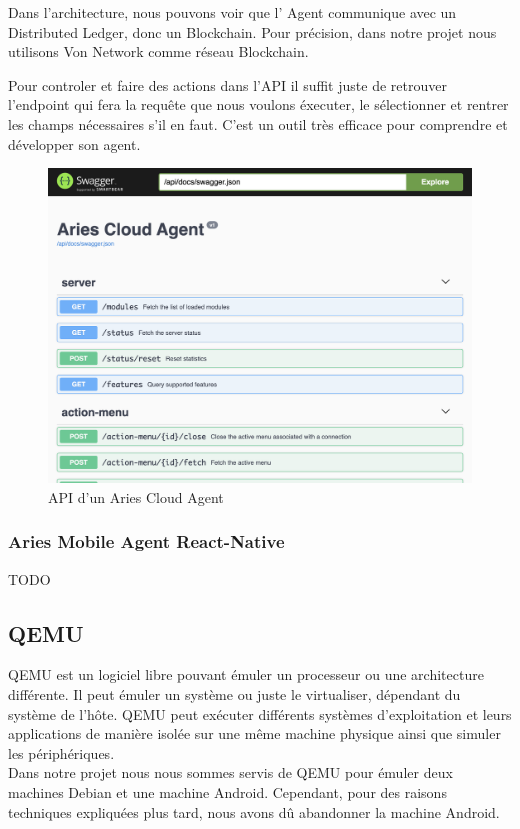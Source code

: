\documentclass[12pt, openany]{report}
\begin{document}
\vspace{2mm}
Dans l'architecture, nous pouvons voir que l' Agent communique avec un Distributed Ledger, donc un Blockchain. Pour précision, dans notre projet nous utilisons Von Network comme réseau Blockchain.

\vspace{2mm}
Pour controler et faire des actions dans l'API il suffit juste de retrouver l'endpoint qui fera la requête que nous voulons éxecuter, le sélectionner et rentrer les champs nécessaires s'il en faut. C'est un outil très efficace pour comprendre et développer son agent. \\
 

\begin{figure}[H]
\includegraphics[scale=0.2]{adminApi.png}
\centering
\caption{API d'un Aries Cloud Agent}
\end{figure}


\subsubsection{Aries Mobile Agent React-Native}
\noindent 
\begin{flushleft}
TODO
\end{flushleft}

\subsection{QEMU}
\noindent 
\begin{flushleft}
QEMU est un logiciel libre  pouvant émuler un processeur ou une architecture différente. Il peut émuler un système ou juste le virtualiser, dépendant du système de l'hôte. QEMU peut exécuter différents systèmes d'exploitation et leurs applications de manière isolée sur une même machine physique ainsi que simuler les périphériques. \\
Dans notre projet nous nous sommes servis de QEMU pour émuler deux machines Debian et une machine Android. Cependant, pour des raisons techniques expliquées plus tard, nous avons dû abandonner la machine Android. 
\end{flushleft}
\end{document}
